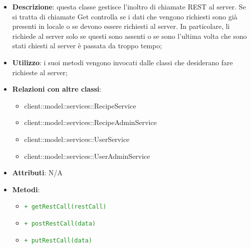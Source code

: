 			\begin{itemize}
				\item \textbf{Descrizione}: questa classe gestisce l'inoltro di chiamate REST al server. Se si tratta di chiamate Get controlla se i dati che vengono richiesti sono già presenti in locale o se devono essere richiesti al server. In particolare, li richiede al server solo se questi sono assenti o se sono l'ultima volta che sono stati chiesti al server è passata da troppo tempo;
				\item \textbf{Utilizzo}: i suoi metodi vengono invocati dalle classi che desiderano fare richieste al server;
				\item \textbf{Relazioni con altre classi}:
					\begin{itemize}
						\item client::model::services::RecipeService
						\item client::model::services::RecipeAdminService
						\item client::model::services::UserService
						\item client::model::services::UserAdminService
					\end{itemize}
				\item \textbf{Attributi}: N/A
				\item \textbf{Metodi}: 
				\begin{itemize}
					\item \textcolor{forestgreen}{\texttt{+ getRestCall(restCall)}}
					\item \textcolor{forestgreen}{\texttt{+ postRestCall(data)}}
					\item \textcolor{forestgreen}{\texttt{+ putRestCall(data)}}
\end{itemize}
\end{itemize}
